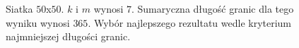 \begin{figure}[h]
\begin{subfigure}{.33\textwidth}
    \caption[short]{}
\end{subfigure}
\caption{Siatka $50$x$50$. $k$ i $m$ wynosi $7$.
Sumaryczna długość granic dla tego wyniku wynosi $365$.
Wybór najlepszego rezultatu wedle kryterium najmniejszej długości granic.}
\label{result:m:2}
\end{figure}
\begin{figure}[h]
\centering
\begin{subfigure}{.33\textwidth}
    \centering
    \caption[short]{}
\end{subfigure}%
\begin{subfigure}{.33\textwidth}
    \centering
    \caption[short]{}
\end{subfigure}

\end{figure}
